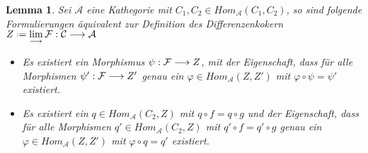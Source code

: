 \documentclass[10pt,a4paper]{report}
\newtheorem{lemma}[satz]{Lemma}
\newcommand{\functionfront}[3]{\nolinebreak{#1:#2 \longrightarrow #3}}
\newcommand{\colimes}[0]{\lim\limits_{ \longrightarrow }}
\newcommand*{\defeq}{\mathrel{\vcenter{\baselineskip0.5ex \lineskiplimit0pt
                     \hbox{\scriptsize.}\hbox{\scriptsize.}}}%
                     =}
\begin{document}
\begin{lemma}\label{Differenzenkokerndef} Sei $\mathcal{A}$ eine Kathegorie mit $C_1,C_2 \in Hom_{\mathcal{A}}(C_1,C_2)$, so sind folgende Formulierungen äquivalent zur Definition des Differenzenkokern $Z \defeq \colimes \functionfront{\mathcal{F}}{\mathcal{C}}{\mathcal{A}}$
\begin{itemize}
\item[1.] Es existiert ein Morphismus $\functionfront{\psi}{\mathcal{F}}{Z}$, mit der Eigenschaft, dass für alle Morphismen $\functionfront{\psi '}{\mathcal{F}}{Z '}$ genau ein $\varphi \in Hom_{\mathcal{A}}(Z,Z')$ mit $\varphi \circ \psi = \psi '$ existiert.
\item[2.] Es existiert ein $q \in Hom_{\mathcal{A}}(C_2,Z)$ mit $q \circ f = q \circ g$ und der Eigenschaft, dass für alle Morphismen $q' \in Hom_{\mathcal{A}}(C_2,Z)$ mit $q' \circ f = q' \circ g$ genau ein $\varphi \in Hom_{\mathcal{A}}(Z,Z')$ mit $\varphi \circ q = q'$ existiert.
\begin{center}
\end{center}
\end{itemize}
\end{lemma}
\end{document}
